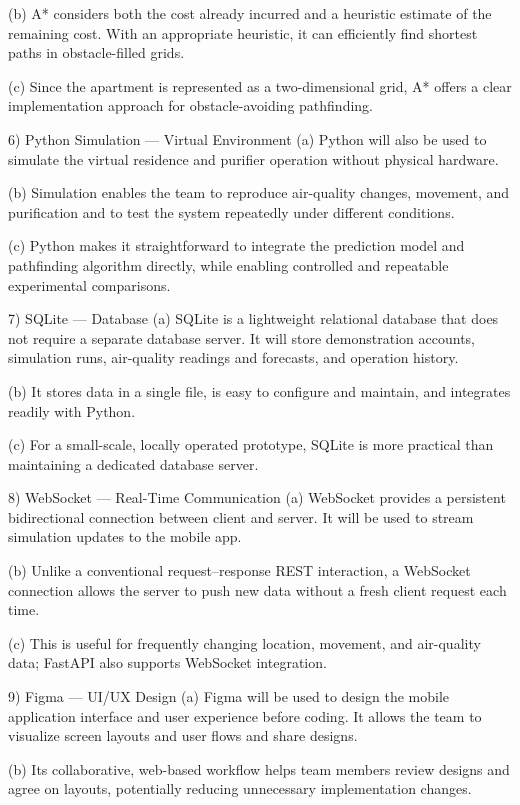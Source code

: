 (b) A* considers both the cost already incurred and a heuristic estimate of the remaining cost. With an appropriate heuristic, it can efficiently find shortest paths in obstacle-filled grids.

(c) Since the apartment is represented as a two-dimensional grid, A* offers a clear implementation approach for obstacle-avoiding pathfinding.

6) Python Simulation — Virtual Environment
(a) Python will also be used to simulate the virtual residence and purifier operation without physical hardware.

(b) Simulation enables the team to reproduce air-quality changes, movement, and purification and to test the system repeatedly under different conditions.

(c) Python makes it straightforward to integrate the prediction model and pathfinding algorithm directly, while enabling controlled and repeatable experimental comparisons.

7) SQLite — Database
(a) SQLite is a lightweight relational database that does not require a separate database server. It will store demonstration accounts, simulation runs, air-quality readings and forecasts, and operation history.

(b) It stores data in a single file, is easy to configure and maintain, and integrates readily with Python.

(c) For a small-scale, locally operated prototype, SQLite is more practical than maintaining a dedicated database server.

8) WebSocket — Real-Time Communication
(a) WebSocket provides a persistent bidirectional connection between client and server. It will be used to stream simulation updates to the mobile app.

(b) Unlike a conventional request–response REST interaction, a WebSocket connection allows the server to push new data without a fresh client request each time.

(c) This is useful for frequently changing location, movement, and air-quality data; FastAPI also supports WebSocket integration.

9) Figma — UI/UX Design
(a) Figma will be used to design the mobile application interface and user experience before coding. It allows the team to visualize screen layouts and user flows and share designs.

(b) Its collaborative, web-based workflow helps team members review designs and agree on layouts, potentially reducing unnecessary implementation changes.

